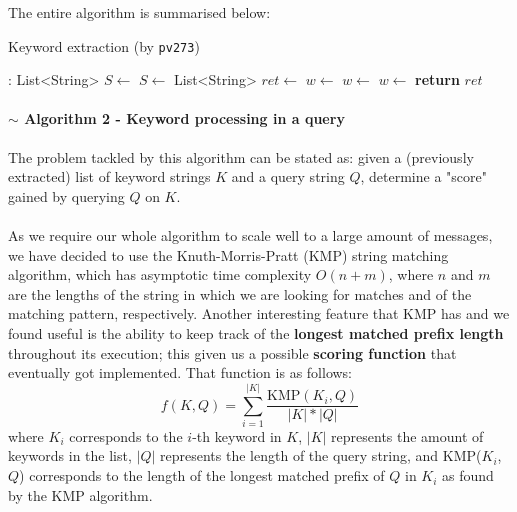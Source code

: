 \documentclass[12p, a4paper, onecolumn]{report}
\begin{document}
The entire algorithm is summarised below:
\begin{algorithm}
\caption{Keyword extraction (by \texttt{pv273})}\label{kwext}
\begin{algorithmic}[1]
 : List<String> 
   \State $S\gets$  
   \State $S\gets$  
   \State List<String> $ret \gets$  
   	\State $w\gets$  
   	  
	\Else
	    \State $w\gets$  
	    \State $w\gets$  
	\EndIf
    \EndFor
   \State \textbf{return} $ret$
\EndFunction
\end{algorithmic}
\end{algorithm}

\paragraph{$\sim$ Algorithm 2 - Keyword processing in a query}

The problem tackled by this algorithm can be stated as: given a (previously extracted) list of keyword strings $K$ and a query string $Q$, determine a "score" gained by querying $Q$ on $K$. \\ \\
As we require our whole algorithm to scale well to a large amount of messages, we have decided to use the Knuth-Morris-Pratt (KMP) string matching algorithm, which has asymptotic time complexity $O(n + m)$, where $n$ and $m$ are the lengths of the string in which we are looking for matches and of the matching pattern, respectively. Another interesting feature that KMP has and we found useful is the ability to keep track of the \textbf{longest matched prefix length} throughout its execution; this given us a possible \textbf{scoring function} that eventually got implemented. That function is as follows:
\[f(K, Q) = \sum_{i=1}^{|K|} \frac{\text{KMP}(K_i, Q)}{|K| * |Q|}\]
where $K_i$ corresponds to the $i$-th keyword in $K$, $|K|$ represents the amount of keywords in the list, $|Q|$ represents the length of the query string, and KMP($K_i$, $Q$) corresponds to the length of the longest matched prefix of $Q$ in $K_i$ as found by the KMP algorithm.
\end{document}

